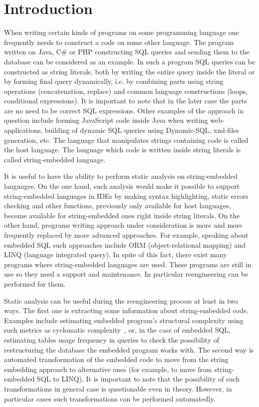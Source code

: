 \section{Introduction}
When writing certain kinds of programs on some programming language one frequently needs to construct a code on some other language. The program written on Java, C\# or PHP constructing SQL queries and sending them to the database can be considered as an example. In such a program SQL queries can be constructed as string literals, both by writing the entire query inside the literal or by forming final query dynamically, i.e. by combining parts using string operations (concatenation, replace) and common language constructions (loops, conditional expressions). It is important to note that in the later case the parts are no need to be correct SQL expressions. Other examples of the approach in question include forming JavaScript code inside Java when writing web-applications, building of dynamic SQL queries using Dynamic-SQL, xml-files generation, etc. The language that manipulates strings containing code is called the host language. The language which code is written inside string literals is called string-embedded language.

It is useful to have the ability to perform static analysis on string-embedded languages. On the one hand, such analysis would make it possible to support string-embedded languages in IDEs by making syntax highlighting, static errors checking and other functions, previously only available for host languages, become available for string-embedded ones right inside string literals. On the other hand, programs writing approach under consideration is more and more frequently replaced by more advanced approaches. For example, speaking about embedded SQL such approaches include ORM (object-relational mapping) and LINQ (language integrated query). In spite of this fact, there exist many programs where string-embedded languages are used. These programs are still in use so they need a support and maintenance. In particular reengineering can be performed for them. 

Static analysis can be useful during the reengineering process at least in two ways. The first one is extracting some information about string-embedded code. Examples include estimating embedded program's structural complexity using such metrics as cyclomatic complexity~\cite{cyclomatic:ref}, or, in the case of embedded SQL, estimating tables usage frequency in queries to check the possibility of restructuring the database the embedded program works with. The second way is automated transformation of the embedded code to move from the string embedding approach to alternative ones (for example, to move from string-embedded SQL to LINQ). It is important to note that the possibility of such transformations in general case is questionable even in theory. However, in particular cases such transformations can be performed automatedly.

